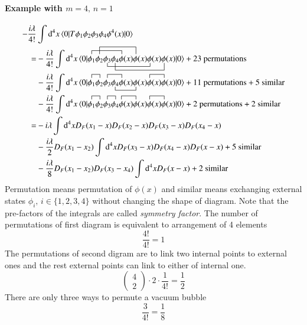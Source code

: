 \paragraph{Example with $m=4 ,\, n=1$}
\begin{align*}
	-\frac{i\lambda}{4!} &\int \dd^4 x \braket{0 | T \phi_1 \phi_2 \phi_3 \phi_4 \phi^4(x) | 0} \\
	= &-\frac{i\lambda}{4!}  \int \dd^4 x \braket{0 |
		\acontraction{}{\phi_1}{\phi_2 \phi_3 \phi_4}{\phi}
		\acontraction[2ex]{\phi_1}{\phi_2}{\phi_3 \phi_4 \phi(x)}{\phi}
		\bcontraction[1ex]{\phi_1\phi_2}{\phi_3}{\phi_4 \phi(x) \phi(x)}{\phi}
		\bcontraction[2ex]{\phi_1 \phi_2 \phi_3}{\phi_4}{\phi(x) \phi(x) \phi(x)}{\phi}
		\phi_1 \phi_2 \phi_3 \phi_4 \phi(x) \phi(x) \phi(x) \phi(x) 
		| 0} + \text{23 permutations} \\
	& -\frac{i\lambda}{4!}  \int \dd^4 x  \braket{0 | 
		\acontraction{}{\phi_1}{}{\phi_2}
		\acontraction{\phi_1\phi_2}{\phi_3}{\phi_4}{\phi}
		\bcontraction{\phi_1 \phi_2 \phi_3}{\phi_4}{\phi(x)}{\phi}
		\acontraction{\phi_1 \phi_2 \phi_3 \phi_4 \phi(x)\phi(x)}{\phi}{(x)}{\phi}
		\phi_1 \phi_2 \phi_3 \phi_4 \phi(x)\phi(x)\phi(x)\phi(x) 
		| 0} + \text{11 permutations} + \text{5 similar} \\
	& -\frac{i\lambda}{4!}  \int \dd^4 x  \braket{0 | 
		\contraction{}{\phi_1}{}{\phi_2}\phi_1 \phi_2 \contraction{}{\phi_3}{}{\phi_4}\phi_3 \phi_4 \contraction{}{\phi}{(x)}{\phi}\phi(x)\phi(x)\contraction{}{\phi}{(x)}{\phi}\phi(x)\phi(x) 
	| 0} + \text{2 permutations} + \text{2 similar} \\
		=& -i\lambda \int \dd^4 x D_F(x_1 - x) D_F(x_2 - x) D_F(x_3 - x) D_F(x_4 - x) \\
	&- \frac{i\lambda}{2} D_F(x_1 - x_2) \int \dd^4 x D_F(x_3 - x) D_F(x_4 - x) D_F(x-x)+ \text{5 similar} \\
	& -\frac{i\lambda}{8} D_F(x_1 - x_2) D_F(x_3 - x_4) \int \dd^4 x D_F(x-x) + \text{2 similar}
\end{align*}
Permutation means permutation of $\phi(x)$ and similar means exchanging external states $\phi_i, \,i \in \{1,2,3,4 \}$ without changing the shape of diagram. Note that the pre-factors of the integrals are called \textit{symmetry factor}. The number of permutations of first diagram is equivalent to arrangement of 4 elements
$$\frac{4!}{4!}=1$$ 
The permutations of second digram are to link two internal points to external ones and the rest external points can link to either of internal one.
$$\begin{pmatrix} 4 \\ 2 \end{pmatrix}\cdot 2 \cdot \frac{1}{4!}= \frac 1 2$$ 
There are only three ways to permute a vacuum bubble
$$\frac{3}{4!}=\frac 1 8$$

